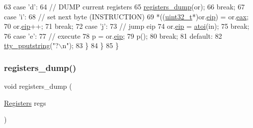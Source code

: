 \begin{DoxyCode}
63             \textcolor{keywordflow}{case} \textcolor{charliteral}{'d'}:
64                 \textcolor{comment}{// DUMP current registers}
65                 \hyperlink{a00167_ac4a1734d665cf10e32ddb9ebebfd8169_ac4a1734d665cf10e32ddb9ebebfd8169}{registers\_dump}(or);
66                 \textcolor{keywordflow}{break};
67             \textcolor{keywordflow}{case} \textcolor{charliteral}{'i'}:
68                 \textcolor{comment}{// set next byte (INSTRUCTION)}
69                 *((\hyperlink{a00134_a435d1572bf3f880d55459d9805097f62_a435d1572bf3f880d55459d9805097f62}{uint32\_t}*)or.\hyperlink{a00250_ad5110c091e713dabd23f23a62d026c07_ad5110c091e713dabd23f23a62d026c07}{eip}) = or.\hyperlink{a00250_aafc7189a84cb0f6ed3d37ee82bec09bc_aafc7189a84cb0f6ed3d37ee82bec09bc}{eax};
70                 or.\hyperlink{a00250_ad5110c091e713dabd23f23a62d026c07_ad5110c091e713dabd23f23a62d026c07}{eip}++;
71                 \textcolor{keywordflow}{break};
72             \textcolor{keywordflow}{case} \textcolor{charliteral}{'j'}:
73                 \textcolor{comment}{// jump eip}
74                 or.\hyperlink{a00250_ad5110c091e713dabd23f23a62d026c07_ad5110c091e713dabd23f23a62d026c07}{eip} = \hyperlink{a00119_a8456d79947fb428e0927d19e7a1e9423_a8456d79947fb428e0927d19e7a1e9423}{atoi}(in);
75                 \textcolor{keywordflow}{break};
76             \textcolor{keywordflow}{case} \textcolor{charliteral}{'e'}:
77                 \textcolor{comment}{// execute}
78                 p = or.\hyperlink{a00250_ad5110c091e713dabd23f23a62d026c07_ad5110c091e713dabd23f23a62d026c07}{eip};
79                 p();
80                 \textcolor{keywordflow}{break};
81             \textcolor{keywordflow}{default}:
82                 \hyperlink{a00173_ade960b1320324706aac6c00cc6b1b2fe_ade960b1320324706aac6c00cc6b1b2fe}{tty\_pputstring}(\textcolor{stringliteral}{"?\(\backslash\)n"});
83         \}
84     \}
85 \}
\end{DoxyCode}
\mbox{\label{a00167_ac4a1734d665cf10e32ddb9ebebfd8169_ac4a1734d665cf10e32ddb9ebebfd8169}} 
\subsubsection{\texorpdfstring{registers\+\_\+dump()}{registers\_dump()}}
{\footnotesize\ttfamily void registers\+\_\+dump (\begin{DoxyParamCaption}\item[{\hyperlink{a00250}{Registers}}]{regs }\end{DoxyParamCaption})}



